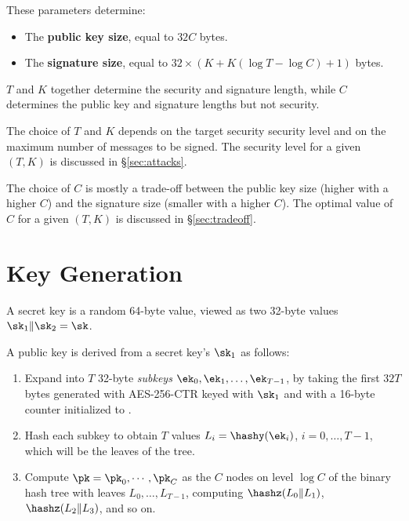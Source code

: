 These parameters determine:

\begin{itemize}

\item The \textbf{public key size}, equal to $32C$ bytes.

\item The \textbf{signature size}, equal to $32\times (K + K(\log T- \log C)+1)$ bytes.

\end{itemize}

$T$ and $K$ together determine the security and signature length, while $C$ determines the public key and signature lengths but not security. 

The choice of $T$ and $K$ depends on the target security security level and on the maximum number of messages to be signed.
The security level for a given $(T,K)$ is discussed in \S\ref{sec:attacks}.

The choice of $C$ is mostly a trade-off between the public key size (higher with a higher $C$) and the  signature size (smaller with a higher $C$).
The optimal value of $C$ for a given $(T,K)$ is discussed in \S\ref{sec:tradeoff}.


\section{Key Generation}

A secret key \sk is a random 64-byte value, viewed as two 32-byte values $\sk_1\Vert\sk_2=\sk$.

A public key \pk is derived from a secret key's $\sk_1$ as follows:

\begin{enumerate}

\item Expand \sk into $T$ 32-byte \emph{subkeys} $\ek_0, \ek_1, \dots, \ek_{T-1}$, by taking the first $32T$ bytes generated with AES-256-CTR keyed with $\sk_1$ and with a 16-byte counter initialized to .

\item Hash each subkey to obtain $T$ values $L_i=\hashy(\ek_i)$, $i=0,\dots,T-1$, which will be the leaves of the tree.

\item Compute $\pk = \pk_0, \cdots, \pk_{C}$ as the $C$ nodes on level $\log C$ of the binary hash tree with leaves $L_0, \dots, L_{T-1}$, computing $\hashz(L_0\Vert L_1)$, $\hashz(L_2\Vert L_3)$, and so on.

\end{enumerate}

